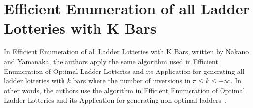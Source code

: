 \section{Efficient Enumeration of all Ladder Lotteries with K Bars}

In Efficient Enumeration of all Ladder Lotteries with K Bars, written by Nakano and Yamanaka, the authors apply the same algorithm used in 
Efficient Enumeration of Optimal Ladder Lotteries 
and its Application for generating all ladder lotteries with $k$ bars where the number of inversions in $\pi \leq k \leq +\infty$.
In other words, the authors use the algorithm in Efficient Enumeration of Optimal Ladder Lotteries and its Application for generating 
non-optimal ladders~\cite{A4}.